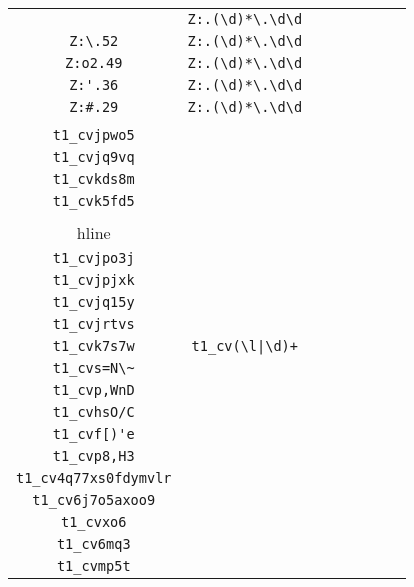 \begin{longtable}{cccccccc}
\begin{tabular}{ll}
    \verb|Z:I.54| & \verb|Z:.(\d)*\.\d\d|\\
\verb|Z:\.52| & \verb|Z:.(\d)*\.\d\d|\\
\verb|Z:o2.49| & \verb|Z:.(\d)*\.\d\d|\\
\verb|Z:'.36| & \verb|Z:.(\d)*\.\d\d|\\
\verb|Z:#.29| & \verb|Z:.(\d)*\.\d\d|
\end{tabular}
\\\midrule 
\begin{tabular}{l}
    \verb|t1_cvk5ckb|\\
\verb|t1_cvjpwo5|\\
\verb|t1_cvjq9vq|\\
\verb|t1_cvkds8m|\\
\verb|t1_cvk5fd5|\\
\\hline\\
\verb|t1_cvjpo3j|\\
\verb|t1_cvjpjxk|\\
\verb|t1_cvjq15y|\\
\verb|t1_cvjrtvs|\\
\verb|t1_cvk7s7w|
\end{tabular}

&
\verb.t1_cv(\l|\d)+.
&

\begin{tabular}{l}
    \verb|t1_cv\l....|\\
\verb|t1_cvs=N\~|\\
\verb|t1_cvp,WnD|\\
\verb|t1_cvhsO/C|\\
\verb|t1_cvf[)'e|\\
\verb|t1_cvp8,H3|
\end{tabular}

&

\begin{tabular}{l}
    \verb|t1_cv((\d)*\l)*\l\d(\l)*|\\
\verb|t1_cv4q77xs0fdymvlr|\\
\verb|t1_cv6j7o5axoo9|\\
\verb|t1_cvxo6|\\
\verb|t1_cv6mq3|\\
\verb|t1_cvmp5t|
\end{tabular}

&


\end{longtable}
